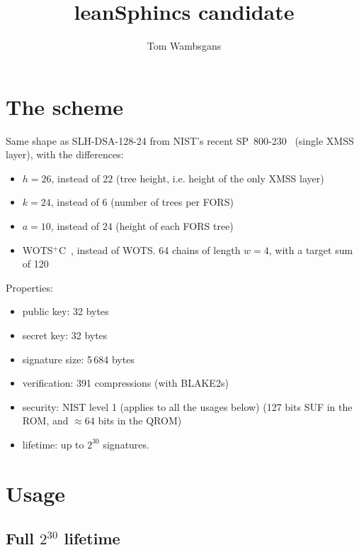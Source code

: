 \documentclass[11pt]{article}
\title{leanSphincs candidate}
\author{Tom Wambsgans}
\date{}
\begin{document}
\maketitle
\vspace{-3em}

\begin{center}
\end{center}

\section{The scheme}

Same shape as SLH-DSA-128-24 from NIST's recent SP~800-230~\cite{SP800230} (single XMSS layer), with the differences:
  \begin{itemize}
    \item $h = 26$, instead of $22$ (tree height, i.e. height of the only XMSS layer)
    \item $k = 24$, instead of $6$ (number of trees per FORS)
    \item $a = 10$, instead of $24$ (height of each FORS tree)
    \item WOTS$^+$C~\cite{HK22C}, instead of WOTS. 64 chains of length $w=4$, with a target sum of 120
  \end{itemize}

Properties:

\begin{itemize}
  \item public key: 32 bytes
  \item secret key: 32 bytes
  \item signature size: 5\,684 bytes
  \item verification: 391 compressions (with BLAKE2s)
  \item security: NIST level 1 \cite{FIPS205} (applies to all the usages below) (127 bits SUF in the ROM, and $\approx 64$ bits in the QROM)
  \item lifetime: up to $2^{30}$ signatures.
\end{itemize}

\section{Usage}

\subsection{Full \texorpdfstring{$2^{30}$}{2\textasciicircum 30} lifetime}
\end{document}
